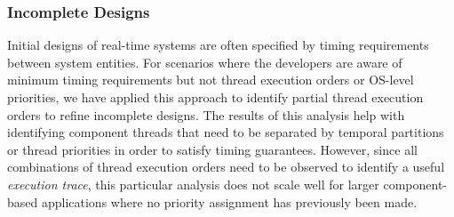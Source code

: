 


\subsubsection{Incomplete Designs}

Initial designs of real-time systems are often specified by timing requirements between system entities. For scenarios where the developers are aware of minimum timing requirements but not thread execution orders or OS-level priorities, we have applied this approach to identify partial thread execution orders to refine incomplete designs. The results of this analysis help with identifying component threads that need to be separated by temporal partitions or thread priorities in order to satisfy timing guarantees.  However, since all combinations of thread execution orders need to be observed to identify a useful \emph{execution trace}, this particular analysis does not scale well for larger component-based applications where no priority assignment has previously been made. 

